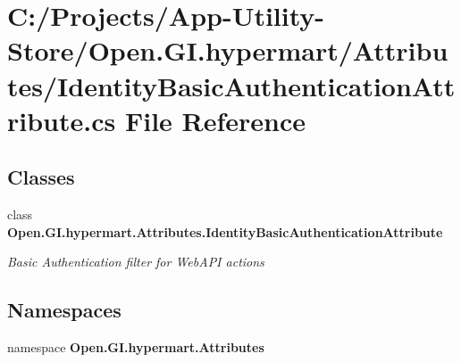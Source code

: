 \section{C\+:/\+Projects/\+App-\/\+Utility-\/\+Store/\+Open.G\+I.\+hypermart/\+Attributes/\+Identity\+Basic\+Authentication\+Attribute.cs File Reference}
\label{_identity_basic_authentication_attribute_8cs}
\subsection*{Classes}
\begin{DoxyCompactItemize}
\item 
class \textbf{ Open.\+G\+I.\+hypermart.\+Attributes.\+Identity\+Basic\+Authentication\+Attribute}
\begin{DoxyCompactList}\small\item\em Basic Authentication filter for Web\+A\+PI actions \end{DoxyCompactList}\end{DoxyCompactItemize}
\subsection*{Namespaces}
\begin{DoxyCompactItemize}
\item 
namespace \textbf{ Open.\+G\+I.\+hypermart.\+Attributes}
\end{DoxyCompactItemize}
